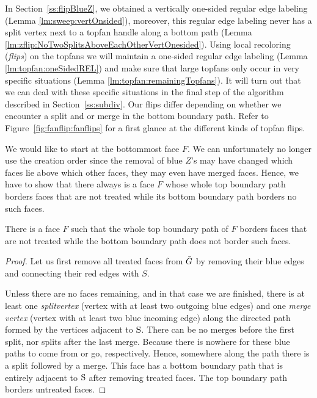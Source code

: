 In Section~\ref{ss:flipBlueZ}, we obtained a vertically one-sided regular edge labeling (Lemma \ref{lm:sweep:vertOnsided}), moreover, this regular edge labeling never has a split vertex next to a topfan handle along a bottom path (Lemma \ref{lm:zflip:NoTwoSplitsAboveEachOtherVertOnesided}).
Using local recoloring (\emph{flips}) on the topfans we will maintain a one-sided regular edge labeling (Lemma \ref{lm:topfan:oneSidedREL}) and make sure that large topfans only occur in very specific situations (Lemma \ref{lm:topfan:remainingTopfans}). It will turn out that we can deal with these specific situations in the final step of the algorithm described in Section~\ref{ss:subdiv}.
Our flips differ depending on whether we encounter a split and or merge in the bottom boundary path.
Refer to Figure~\ref{fig:fanflip:fanflips} for a first glance at the different kinds of topfan flips.


  We would like to start at the bottommost face $F$. We can unfortunately no longer use the creation order since the removal of blue $Z$'s may have changed which faces lie above which other faces, they may even have merged faces.
  Hence, we have to show that there always is a face $F$ whose whole top boundary path borders faces that are not treated while its bottom boundary path borders no such faces.

  \begin{lemma}
    \label{lm:top:order}
    There is a face $F$ such that the whole top boundary path of $F$ borders faces that are not treated while the bottom boundary path does not border such faces.
  \end{lemma}
  \begin{proof}
    Let us first remove all treated faces from $\bar{G}$ by removing their blue edges and connecting their red edges with $S$.

    Unless there are no faces remaining, and in that case we are finished, there is at least one \emph{splitvertex} (vertex with at least two outgoing blue edges) and one \emph{merge vertex} (vertex with at least two blue incoming edge) along the directed path formed by the vertices adjacent to $\mathrm{S}$.
    There can be no merges before the first split, nor splits after the last merge. Because there is nowhere for these blue paths to come from or go, respectively.
    Hence, somewhere along the path there is a split followed by a merge.
    This face has a bottom boundary path that is entirely adjacent to $\mathrm{S}$ after removing treated faces.
    The top boundary path borders untreated faces.
  \end{proof}

